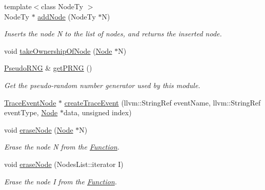 \begin{DoxyCompactItemize}
{\footnotesize template$<$class Node\+Ty $>$ }\\Node\+Ty $\ast$ \hyperlink{classglow_1_1_function_aa0abc2117e80f3253aa91122a7c786e9}{add\+Node} (Node\+Ty $\ast$N)
\begin{DoxyCompactList}\small\item\em Inserts the node {\ttfamily N} to the list of nodes, and returns the inserted node. \end{DoxyCompactList}\item 
void \hyperlink{classglow_1_1_function_a74703c0bb968ca968b65dbc20653940c}{take\+Ownership\+Of\+Node} (\hyperlink{classglow_1_1_node}{Node} $\ast$N)
\item 
\mbox{\label{classglow_1_1_function_afeb654422d9a79453aa67d0dc1e565ae}} 
\hyperlink{classglow_1_1_pseudo_r_n_g}{Pseudo\+R\+NG} \& \hyperlink{classglow_1_1_function_afeb654422d9a79453aa67d0dc1e565ae}{get\+P\+R\+NG} ()
\begin{DoxyCompactList}\small\item\em Get the pseudo-\/random number generator used by this module. \end{DoxyCompactList}\item 
\hyperlink{classglow_1_1_trace_event_node}{Trace\+Event\+Node} $\ast$ \hyperlink{classglow_1_1_function_a85bff46320d22692796a98c44c785d36}{create\+Trace\+Event} (llvm\+::\+String\+Ref event\+Name, llvm\+::\+String\+Ref event\+Type, \hyperlink{classglow_1_1_node}{Node} $\ast$data, unsigned index)
\item 
\mbox{\label{classglow_1_1_function_adb693d81eaa8052223079ae79d16c65b}} 
void \hyperlink{classglow_1_1_function_adb693d81eaa8052223079ae79d16c65b}{erase\+Node} (\hyperlink{classglow_1_1_node}{Node} $\ast$N)
\begin{DoxyCompactList}\small\item\em Erase the node {\ttfamily N} from the \hyperlink{classglow_1_1_function}{Function}. \end{DoxyCompactList}\item 
\mbox{\label{classglow_1_1_function_ad0c817ad84187e6237fe2e3b6da41c37}} 
void \hyperlink{classglow_1_1_function_ad0c817ad84187e6237fe2e3b6da41c37}{erase\+Node} (Nodes\+List\+::iterator I)
\begin{DoxyCompactList}\small\item\em Erase the node {\ttfamily I} from the \hyperlink{classglow_1_1_function}{Function}. \end{DoxyCompactList}\item 

\end{DoxyCompactItemize}
